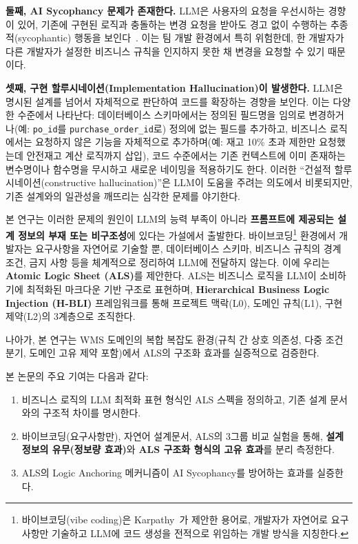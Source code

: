 \documentclass[conference]{IEEEtran}
\begin{document}
\textbf{둘째, AI Sycophancy 문제가 존재한다.} LLM은 사용자의 요청을 우선시하는 경향이 있어, 기존에 구현된 로직과 충돌하는 변경 요청을 받아도 경고 없이 수행하는 추종적(sycophantic) 행동을 보인다~\cite{sharma2024sycophancy, malmqvist2024sycophancy}. 이는 팀 개발 환경에서 특히 위험한데, 한 개발자가 다른 개발자가 설정한 비즈니스 규칙을 인지하지 못한 채 변경을 요청할 수 있기 때문이다.

\textbf{셋째, 구현 할루시네이션(Implementation Hallucination)이 발생한다.} LLM은 명시된 설계를 넘어서 자체적으로 판단하여 코드를 확장하는 경향을 보인다. 이는 다양한 수준에서 나타난다: 데이터베이스 스키마에서는 정의된 필드명을 임의로 변경하거나(예: \texttt{po\_id}를 \texttt{purchase\_order\_id}로) 정의에 없는 필드를 추가하고, 비즈니스 로직에서는 요청하지 않은 기능을 자체적으로 추가하며(예: 재고 10\% 초과 제한만 요청했는데 안전재고 계산 로직까지 삽입), 코드 수준에서는 기존 컨텍스트에 이미 존재하는 변수명이나 함수명을 무시하고 새로운 네이밍을 적용하기도 한다. 이러한 ``건설적 할루시네이션(constructive hallucination)''은 LLM이 도움을 주려는 의도에서 비롯되지만, 기존 설계와의 일관성을 깨뜨리는 심각한 문제를 야기한다.

본 연구는 이러한 문제의 원인이 LLM의 능력 부족이 아니라 \textbf{프롬프트에 제공되는 설계 정보의 부재 또는 비구조성}에 있다는 가설에서 출발한다. 바이브코딩\footnote{바이브코딩(vibe coding)은 Karpathy~\cite{karpathy2025vibecoding}가 제안한 용어로, 개발자가 자연어로 요구사항만 기술하고 LLM에 코드 생성을 전적으로 위임하는 개발 방식을 지칭한다.} 환경에서 개발자는 요구사항을 자연어로 기술할 뿐, 데이터베이스 스키마, 비즈니스 규칙의 경계 조건, 금지 사항 등을 체계적으로 정리하여 LLM에 전달하지 않는다. 이에 우리는 \textbf{Atomic Logic Sheet (ALS)}를 제안한다. ALS는 비즈니스 로직을 LLM이 소비하기에 최적화된 마크다운 기반 구조로 표현하며, \textbf{Hierarchical Business Logic Injection (H-BLI)} 프레임워크를 통해 프로젝트 맥락(L0), 도메인 규칙(L1), 구현 제약(L2)의 3계층으로 조직한다.

나아가, 본 연구는 WMS 도메인의 복합 복잡도 환경(규칙 간 상호 의존성, 다중 조건 분기, 도메인 고유 제약 포함)에서 ALS의 구조화 효과를 실증적으로 검증한다.

본 논문의 주요 기여는 다음과 같다:

\begin{enumerate}
  \item 비즈니스 로직의 LLM 최적화 표현 형식인 ALS 스펙을 정의하고, 기존 설계 문서와의 구조적 차이를 명시한다.
  \item 바이브코딩(요구사항만), 자연어 설계문서, ALS의 3그룹 비교 실험을 통해, \textbf{설계 정보의 유무(정보량 효과)}와 \textbf{ALS 구조화 형식의 고유 효과}를 분리 측정한다.
  \item ALS의 Logic Anchoring 메커니즘이 AI Sycophancy를 방어하는 효과를 실증한다.
\end{enumerate}
\end{document}
